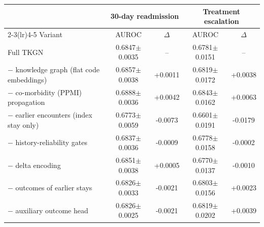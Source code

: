 \begin{tabular}{@{}lcccc@{}}
\toprule
 & \multicolumn{2}{c}{30-day readmission} & \multicolumn{2}{c}{Treatment escalation} \\
\cmidrule(lr){2-3}\cmidrule(lr){4-5}
Variant & AUROC & $\Delta$ & AUROC & $\Delta$ \\
\midrule
Full TKGN & 0.6847$\pm$0.0035 & -- & 0.6781$\pm$0.0151 & -- \\
$-$ knowledge graph (flat code embeddings) & 0.6857$\pm$0.0038 & +0.0011 & 0.6819$\pm$0.0172 & +0.0038 \\
$-$ co-morbidity (PPMI) propagation & 0.6888$\pm$0.0036 & +0.0042 & 0.6843$\pm$0.0162 & +0.0063 \\
$-$ earlier encounters (index stay only) & 0.6773$\pm$0.0059 & -0.0073 & 0.6601$\pm$0.0191 & -0.0179 \\
$-$ history-reliability gates & 0.6837$\pm$0.0036 & -0.0009 & 0.6778$\pm$0.0158 & -0.0002 \\
$-$ delta encoding & 0.6851$\pm$0.0038 & +0.0005 & 0.6770$\pm$0.0137 & -0.0010 \\
$-$ outcomes of earlier stays & 0.6826$\pm$0.0033 & -0.0021 & 0.6803$\pm$0.0156 & +0.0023 \\
$-$ auxiliary outcome head & 0.6826$\pm$0.0025 & -0.0021 & 0.6819$\pm$0.0202 & +0.0039 \\
\bottomrule
\end{tabular}
